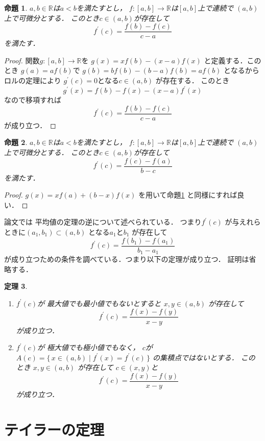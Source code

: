\documentclass[leqno, a4paper, 12pt]{jsarticle}
\newtheorem{thm}{定理}
\newtheorem{prop}[thm]{命題}
\newcommand{\rr}{\mathbb{R}}
\newcommand{\bibun}[1]{#1^{\prime}}
\begin{document}
\begin{prop}\label{prop:fl3}
$a, b\in \rr$は$a<b$を満たすとし，
$f: [a, b]\to \rr$は$[a, b]$上で連続で
$(a, b)$上で可微分とする．
このとき$c\in (a, b)$が存在して
\[
\bibun{f}(c)=\frac{f(b)-f(c)}{c-a}
\]
を満たす．
\end{prop}
\begin{proof}
関数$g: [a, b]\to \rr$を
$g(x)=xf(b)-(x-a)f(x)$
と定義する．このとき
$g(a)=af(b)$で
$g(b)=bf(b)-(b-a)f(b)=af(b)$
となるからロルの定理により
$\bibun{g}(c)=0$となる$c\in (a, b)$
が存在する．
このとき
\[
\bibun{g}(x)=f(b)-f(x)-(x-a)\bibun{f}(x)
\]
なので移項すれば
\[
\bibun{f}(c)=\frac{f(b)-f(c)}{c-a}
\]
が成り立つ．
\end{proof}


\begin{prop}\label{prop:fl4}
$a, b\in \rr$は$a<b$を満たすとし，
$f: [a, b]\to \rr$は$[a, b]$上で連続で
$(a, b)$上で可微分とする．
このとき$c\in (a, b)$が存在して
\[
\bibun{f}(c)=\frac{f(c)-f(a)}{b-c}
\]
を満たす．
\end{prop}
\begin{proof}
$g(x)=xf(a)+(b-x)f(x)$
を用いて命題\ref{prop:fl3}
と同様にすれば良い．
\end{proof}


論文\cite{TB}では
平均値の定理の逆について述べられている．
つまり$f^{\prime}(c)$
が与えれらときに$(a_{1}, b_{1})\subset (a, b)$
となる$a_{1}$と$b_{1}$
が存在して
\[
f^{\prime}(c)=\frac{f(b_{1})-f(a_{1})}{b_{1}-a_{1}}
\]
が成り立つための条件を調べている．つまり以下の定理が成り立つ．
証明は省略する．
\begin{thm}

\begin{enumerate}
\item $\bibun{f}(c)$が
最大値でも最小値でもないとすると
$x, y\in (a, b)$
が存在して
\[
\bibun{f}(c)=\frac{f(x)-f(y)}{x-y}
\]
が成り立つ．
\item
$\bibun{f}(c)$が
極大値でも極小値でもなく，
$c$が$A(c)=\{\, 
x\in (a, b)\mid 
\bibun{f}(x)=\bibun{f}(c)
\, \}$
の集積点ではないとする．
このとき
$x, y\in (a, b)$
が存在して
$c\in (x, y)$と
\[
\bibun{f}(c)=\frac{f(x)-f(y)}{x-y}
\]
が成り立つ．

\end{enumerate}
\end{thm}



\section{テイラーの定理}
\end{document}
